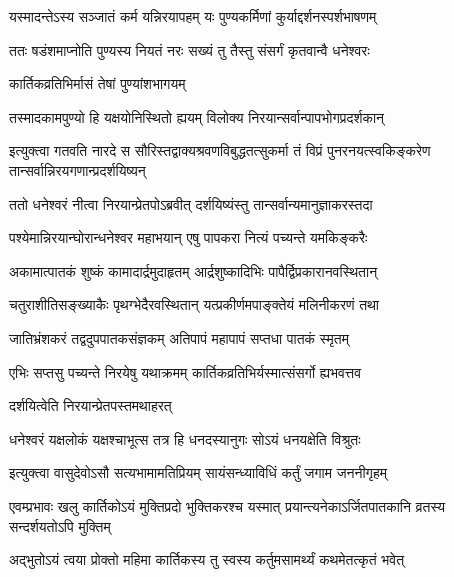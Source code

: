 \twolineshloka
{यस्मादन्तेऽस्य सञ्जातं कर्म यन्निरयापहम्}
{यः पुण्यकर्मिणां कुर्याद्दर्शनस्पर्शभाषणम्} %

\twolineshloka
{ततः षडंशमाप्नोति पुण्यस्य नियतं नरः}
{सख्यं तु तैस्तु संसर्गं कृतवान्वै धनेश्वरः} %


\onelineshloka
{कार्तिकव्रतिभिर्मासं तेषां पुण्यांशभागयम्} %

\twolineshloka
{तस्मादकामपुण्यो हि यक्षयोनिस्थितो ह्ययम्}
{विलोक्य निरयान्सर्वान्पापभोगप्रदर्शकान्} %


\twolineshloka
{इत्युक्त्वा गतवति नारदे स सौरिस्तद्वाक्यश्रवणविबुद्धतत्सुकर्मा}
{तं विप्रं पुनरनयत्स्वकिङ्करेण तान्सर्वान्निरयगणान्प्रदर्शयिष्यन्} %


\twolineshloka
{ततो धनेश्वरं नीत्वा निरयान्प्रेतपोऽब्रवीत्}
{दर्शयिष्यंस्तु तान्सर्वान्यमानुज्ञाकरस्तदा} %


\twolineshloka
{पश्येमान्निरयान्घोरान्धनेश्वर महाभयान्}
{एषु पापकरा नित्यं पच्यन्ते यमकिङ्करैः} %

\twolineshloka
{अकामात्पातकं शुष्कं कामादार्द्रमुदाहृतम्}
{आर्द्रशुष्कादिभिः पापैर्द्विप्रकारानवस्थितान्} %

\twolineshloka
{चतुराशीतिसङ्ख्याकैः पृथग्भेदैरवस्थितान्}
{यत्प्रकीर्णमपाङ्क्तेयं मलिनीकरणं तथा} %

\twolineshloka
{जातिभ्रंशकरं तद्वदुपपातकसंज्ञकम्}
{अतिपापं महापापं सप्तधा पातकं स्मृतम्} %

\twolineshloka
{एभिः सप्तसु पच्यन्ते निरयेषु यथाक्रमम्}
{कार्तिकव्रतिभिर्यस्मात्संसर्गो ह्यभवत्तव} %




\onelineshloka
{दर्शयित्वेति निरयान्प्रेतपस्तमथाहरत्} %

\twolineshloka
{धनेश्वरं यक्षलोकं यक्षश्चाभूत्स तत्र हि}
{धनदस्यानुगः सोऽयं धनयक्षेति विश्रुतः} %


\twolineshloka
{इत्युक्त्वा वासुदेवोऽसौ सत्यभामामतिप्रियम्}
{सायंसन्ध्याविधिं कर्तुं जगाम जननीगृहम्} %


\twolineshloka
{एवम्प्रभावः खलु कार्तिकोऽयं मुक्तिप्रदो भुक्तिकरश्च यस्मात्}
{प्रयान्त्यनेकाऽर्जितपातकानि व्रतस्य सन्दर्शयतोऽपि मुक्तिम्} %





\twolineshloka
{अद्भुतोऽयं त्वया प्रोक्तो महिमा कार्तिकस्य तु}
{स्वस्य कर्तुमसामर्थ्यं कथमेतत्कृतं भवेत्} %


